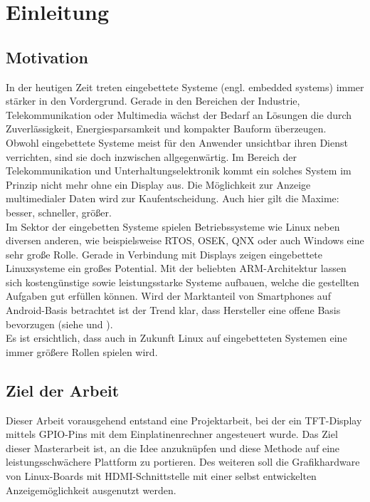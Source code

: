 
\chapter{Einleitung}
\label{cha:Einleitung}

\section{Motivation}
In der heutigen Zeit treten eingebettete Systeme (engl. embedded systems) immer stärker in den Vordergrund. Gerade in den Bereichen der Industrie, Telekommunikation oder Multimedia wächst der Bedarf an Lösungen die durch Zuverlässigkeit, Energiesparsamkeit und kompakter Bauform überzeugen.\\
Obwohl eingebettete Systeme meist für den Anwender unsichtbar ihren Dienst verrichten, sind sie doch inzwischen allgegenwärtig. Im Bereich der Telekommunikation und Unterhaltungselektronik kommt ein solches System im Prinzip nicht mehr ohne ein Display aus. Die Möglichkeit zur Anzeige multimedialer Daten wird zur Kaufentscheidung. Auch hier gilt die Maxime: besser, schneller, größer.\\
Im Sektor der eingebetten Systeme spielen Betriebssysteme wie Linux neben diversen anderen, wie beispielsweise RTOS, OSEK, QNX oder auch Windows eine sehr große Rolle. Gerade in Verbindung mit Displays zeigen eingebettete Linuxsysteme ein großes Potential. Mit der beliebten ARM-Architektur lassen sich kostengünstige sowie leistungsstarke Systeme aufbauen, welche die gestellten Aufgaben gut erfüllen können. Wird der Marktanteil von Smartphones auf Android-Basis betrachtet ist der Trend klar, dass Hersteller eine offene Basis bevorzugen (siehe \cite{android2014} und \cite{Brandt2013}).\\
Es ist ersichtlich, dass auch in Zukunft Linux auf eingebetteten Systemen eine immer größere Rollen spielen wird. 

\section{Ziel der Arbeit}
Dieser Arbeit vorausgehend entstand eine Projektarbeit, bei der ein TFT-Display mittels GPIO-Pins mit dem Einplatinenrechner  angesteuert wurde. Das Ziel dieser Masterarbeit ist, an die Idee anzuknüpfen und diese Methode auf eine leistungsschwächere Plattform zu portieren. Des weiteren soll die Grafikhardware von Linux-Boards mit HDMI-Schnittstelle mit einer selbst entwickelten Anzeigemöglichkeit ausgenutzt werden.
